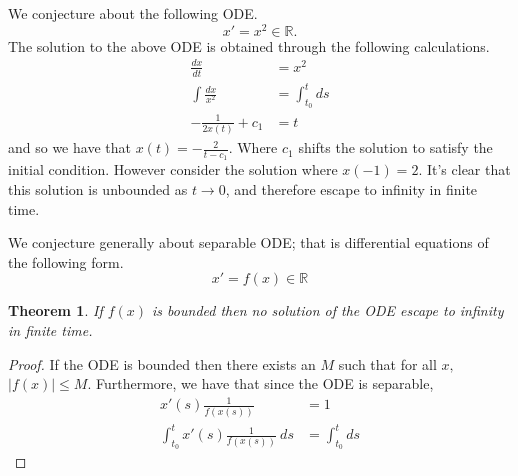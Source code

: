 \documentclass[letter]{article}
\newtheorem{theorem}{Theorem}
\newenvironment{menumerate}{%
  \edef\backupindent{\the\parindent}%
  \enumerate%
  \setlength{\parindent}{\backupindent}%
}{\endenumerate}
\begin{document}
\begin{menumerate}
\item We conjecture about the following ODE.
    $$x' = x^2 \in \mathbb{R}.$$
    The solution to the above ODE is obtained through the following calculations.
    \begin{equation}
        \begin{aligned}
            \frac{dx}{dt} &= x^2 \\
            \int \frac{dx}{x^2} &= \int_{t_0}^t ds \\
            -\frac{1}{2x(t)} + c_1 &= t        
        \end{aligned}
    \end{equation}
    and so we have that $x(t) = -\frac{2}{t-c_1}.$ Where $c_1$ shifts the solution to satisfy the initial condition. 
    However consider the solution where $x(-1) = 2.$ It's clear that this solution is unbounded as $t \to 0$, and therefore 
    escape to infinity in finite time.

\item We conjecture generally about separable ODE; that is differential equations of the following form.
    \begin{equation}
        x' = f(x) \in \mathbb{R}
    \end{equation}

    \begin{theorem}
        If $f(x)$ is bounded then no solution of the ODE escape to infinity in finite time.
    \end{theorem}
    \begin{proof}
        If the ODE is bounded then there exists an $M$ such that for all $x,$ $|f(x)| \leq M.$ 
        Furthermore, we have that since the ODE is separable,
        \begin{equation*}
            \begin{aligned}
                x'(s)\frac{1}{f(x(s))} &= 1 \\
                \int_{t_0}^{t} x'(s)\frac{1}{f(x(s))}\ ds &= \int_{t_0}^{t}ds 
            \end{aligned}
        \end{equation*}
    \end{proof}

\end{menumerate}
\end{document}
